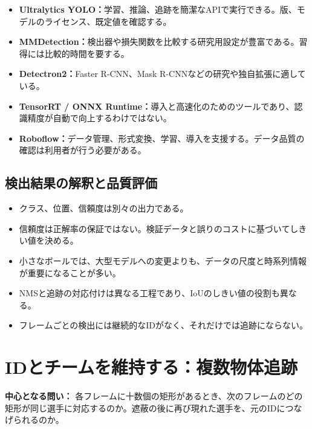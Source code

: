 \documentclass[11pt,a4paper,oneside]{report}
\begin{document}
\begin{toolBox}
\begin{itemize}
  \item \textbf{Ultralytics YOLO：}学習、推論、追跡を簡潔なAPIで実行できる。版、モデルのライセンス、既定値を確認する。
  \item \textbf{MMDetection：}検出器や損失関数を比較する研究用設定が豊富である。習得には比較的時間を要する。
  \item \textbf{Detectron2：}Faster R-CNN、Mask R-CNNなどの研究や独自拡張に適している。
  \item \textbf{TensorRT / ONNX Runtime：}導入と高速化のためのツールであり、認識精度が自動で向上するわけではない。
  \item \textbf{Roboflow：}データ管理、形式変換、学習、導入を支援する。データ品質の確認は利用者が行う必要がある。
\end{itemize}
\end{toolBox}

\section{検出結果の解釈と品質評価}

\begin{takeawayBox}
\begin{itemize}
  \item クラス、位置、信頼度は別々の出力である。
  \item 信頼度は正解率の保証ではない。検証データと誤りのコストに基づいてしきい値を決める。
  \item 小さなボールでは、大型モデルへの変更よりも、データの尺度と時系列情報が重要になることが多い。
  \item NMSと追跡の対応付けは異なる工程であり、IoUのしきい値の役割も異なる。
  \item フレームごとの検出には継続的なIDがなく、それだけでは追跡にならない。
\end{itemize}
\end{takeawayBox}

\chapter{IDとチームを維持する：複数物体追跡}

\begin{heroBox}
\textbf{中心となる問い：}\quad
各フレームに十数個の矩形があるとき、次のフレームのどの矩形が同じ選手に対応するのか。遮蔽の後に再び現れた選手を、元のIDにつなげられるのか。
\end{heroBox}
\end{document}
